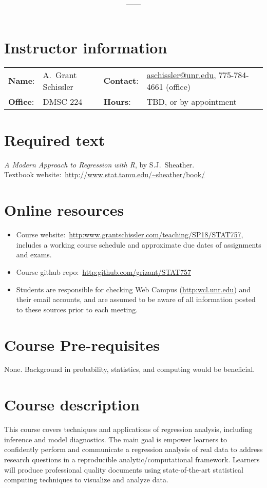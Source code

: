 \documentclass[11pt,onecolumn]{article}
\title{\textbf{\coursename}}
\author{{\semester}---{\roomnumb}---{\classtimes}}
\date{}
\makeatletter
\newcommand{\myname}{A.~Grant Schissler}
\newcommand{\myemail}{aschissler@unr.edu}
\newcommand{\office}{DMSC 224}
\newcommand{\officehours}{TBD, or by appointment}
\makeatother
\begin{document}
\maketitle


\section*{Instructor information}

\begin{tabular}{llll}
\textbf{Name}:&\myname & \textbf{Contact}:&\href{mailto:\myemail}{\myemail}, 775-784-4661 (office)\\
\textbf{Office}:&\office & \textbf{Hours}:&\officehours\\
\end{tabular}

\section*{Required text}
\emph{A Modern Approach to Regression with R}, by S.J.~Sheather. \\
Textbook website:~\url{http://www.stat.tamu.edu/~sheather/book/}

\section*{Online resources}
\begin{itemize}
\item Course website:~\url{http:www.grantschissler.com/teaching/SP18/STAT757}, includes a working course schedule and approximate due dates of assignments and exams.
\item Course github repo:~\url{http:github.com/grizant/STAT757}
\item Students are responsible for checking Web Campus (\url{http:wcl.unr.edu}) and their email accounts, and are assumed to be aware of all information posted to these sources prior to each meeting.
\end{itemize}

\section*{Course Pre-requisites}
None. Background in probability, statistics, and computing would be beneficial.

\section*{Course description}
This course covers techniques and applications of regression analysis, including inference and model diagnostics. The main goal is empower learners to confidently perform and communicate a regression analysis of real data to address research questions in a reproducible analytic/computational framework. Learners will produce professional quality documents using state-of-the-art statistical computing techniques to visualize and analyze data.
\end{document}
